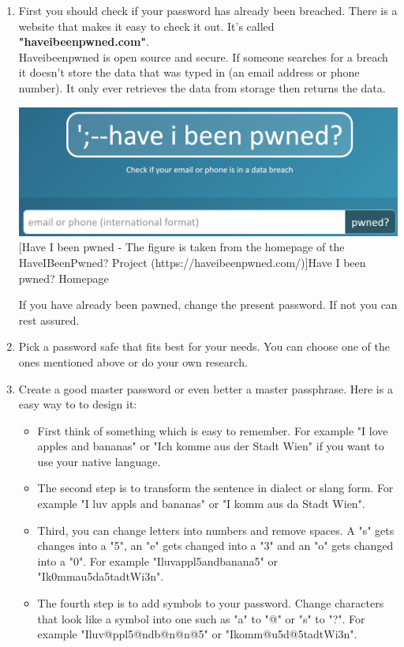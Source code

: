 \documentclass[conference]{IEEEtran}
\begin{document}
\begin{enumerate}
\item First you should check if your password has already been breached. There is a website that makes it easy to check it out. It's called \textbf{"haveibeenpwned.com"}.\\
Haveibeenpwned is open source and secure. If someone searches for a breach it doesn't store the data that was typed in (an email address or phone number). It only ever retrieves the data from storage then returns the data. \vspace{0.5cm}
\begin{center}
\includegraphics[scale=0.29]{./images/haveibeenpwned.png}
[Have I been pwned - The figure is taken from the homepage of the HaveIBeenPwned? Project (https://haveibeenpwned.com/)]{Have I been pwned? Homepage}
\end{center}
If you have already been pawned, change the present password. If not you can rest assured. 
\item Pick a password safe that fits best for your needs. You can choose one of the ones mentioned above or do your own research.
\item Create a good master password or even better a master passphrase. Here is a easy way to to design it: 
\begin{itemize}
\item First think of something which is easy to remember. For example "I love apples and bananas" or "Ich komme aus der Stadt Wien" if you want to use your native language.
\item The second step is to transform the sentence in dialect or slang form. For example "I luv appls and bananas" or "I komm aus da Stadt Wien".
\item Third, you can change letters into numbers and remove spaces. A "s" gets changes into a "5", an "e" gets changed into a "3" and an "o" gets changed into a "0". For example "Iluvappl5andbanana5" or "Ik0mmau5da5tadtWi3n".
\item The fourth step is to add symbols to your password. Change characters that look like a symbol into one such as "a" to "@" or "s" to "?". For example "Iluv@ppl5@ndb@n@n@5" or "Ikomm@u5d@5tadtWi3n".

\end{itemize}
\end{enumerate}
\end{document}
